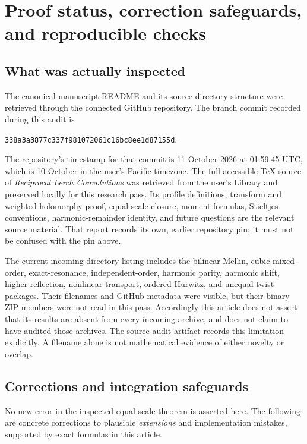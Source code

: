 \documentclass[11pt,a4paper]{article}
\numberwithin{equation}{section}
\theoremstyle{definition}\newtheorem{definition}[theorem]{Definition}
\theoremstyle{remark}\newtheorem{remark}[theorem]{Remark}
\newcommand{\src}[1]{\nolinkurl{#1}}
\begin{document}
\section{Proof status, correction safeguards, and reproducible checks}
\label{clc:sec:audit}

\subsection{What was actually inspected}
The canonical manuscript README and its source-directory structure were
retrieved through the connected GitHub repository. The branch commit
recorded during this audit is
\begin{center}\small
\src{338a3a3877c337f981072061c16bc8ee1d87155d}.
\end{center}
The repository's timestamp for that commit is 11 October 2026 at
01:59:45 UTC, which is 10 October in the user's Pacific timezone.
The full accessible TeX source of \emph{Reciprocal Lerch Convolutions}
was retrieved from the user's Library and preserved locally for this
research pass. Its profile definitions, transform and weighted-holomorphy
proof, equal-scale closure, moment formulas, Stieltjes conventions,
harmonic-remainder identity, and future questions are the relevant
source material. That report records its own, earlier repository pin;
it must not be confused with the pin above.

The current incoming directory listing includes the bilinear Mellin,
cubic mixed-order, exact-resonance, independent-order, harmonic parity,
harmonic shift, higher reflection, nonlinear transport, ordered Hurwitz,
and unequal-twist packages. Their filenames and GitHub metadata were
visible, but their binary ZIP members were not read in this pass.
Accordingly this article does not assert that its results are absent
from every incoming archive, and does not claim to have audited those
archives. The source-audit artifact records this limitation explicitly.
A filename alone is not mathematical evidence of either novelty or overlap.

\subsection{Corrections and integration safeguards}
No new error in the inspected equal-scale theorem is asserted here.
The following are concrete corrections to plausible \emph{extensions}
and implementation mistakes, supported by exact formulas in this article.
\end{document}
